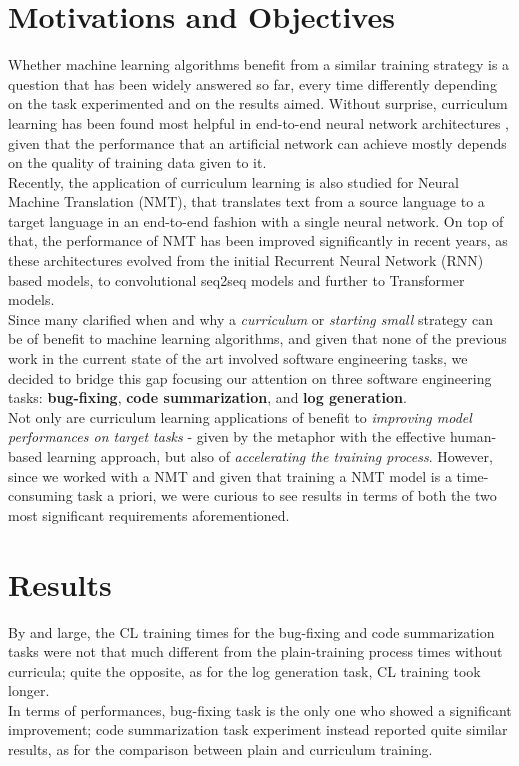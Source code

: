 \section{Motivations and Objectives}
\label{chapter:MAO}
Whether machine learning algorithms benefit from a similar training strategy is a question that has been widely answered so far, 
every time differently depending on the task experimented and on the results aimed. Without surprise, curriculum learning 
has been found most helpful in end-to-end neural network architectures \cite{bengio2009curriculum},
given that the performance that an artificial network can achieve mostly depends on the quality of training data given to it.\\
Recently, the application of curriculum learning is also studied for Neural Machine Translation (NMT), that translates text from a source
language to a target language in an end-to-end fashion with a single neural network. On top of that, the performance of 
NMT has been improved significantly in recent years, as these architectures evolved from the initial Recurrent Neural Network (RNN) based models, to convolutional
seq2seq models and further to Transformer models. \\
\newline
Since many clarified when and why a \textit{curriculum} or \textit{starting small} strategy can be of benefit
to machine learning algorithms, and given that none of the previous work in the current state of the art 
involved software engineering tasks, we decided to bridge this gap focusing our attention on three software engineering tasks: \textbf{bug-fixing}, 
\textbf{code summarization}, and \textbf{log generation}.\\
\newline
Not only are curriculum learning applications of benefit to \textit{improving model performances
on target tasks} - given by the metaphor with 
the effective human-based learning approach, but also of \textit{accelerating the training process}.
However, since we worked with a NMT and given that training a NMT model is a time-consuming task a priori, 
we were curious to see results in terms of both the two most significant requirements 
aforementioned. 


\section{Results}
By and large, the CL training times for the bug-fixing 
and code summarization tasks were not that much different from
the plain-training process times without curricula; quite the opposite, as for the log generation task, CL training took longer.\\
In terms of performances, bug-fixing task is the only one who showed a significant improvement; code summarization task experiment
instead reported quite similar results, as for the comparison between plain and curriculum training.

